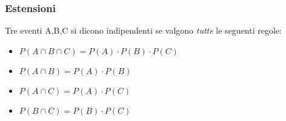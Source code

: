 \subsubsection{Estensioni}

Tre eventi A,B,C si dicono indipendenti se valgono \textit{tutte} le seguenti regole:
\begin{itemize}
    \item $P(A \cap B \cap C) = P(A) \cdot P(B) \cdot P(C)$
    \item $P(A \cap B) = P(A) \cdot P(B)$
    \item $P(A \cap C) = P(A) \cdot P(C)$
    \item $P(B \cap C) = P(B) \cdot P(C)$
\end{itemize}


